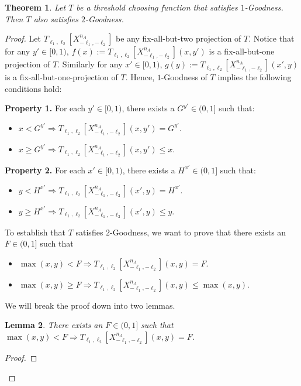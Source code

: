 \documentclass{article}
\newcommand{\xnmltwo}{X^{n_A}_{-\ell_1, -\ell_2}}
\newtheorem{theorem}{Theorem}[section]
\newtheorem{lemma}[theorem]{Lemma}
\begin{document}
\begin{theorem} \label{thm:1implies2}
Let $T$ be a threshold choosing function that satisfies $1$-Goodness. Then $T$ also satisfies $2$-Goodness.
\end{theorem}
\begin{proof}
Let $T_{\ell_1, \ell_2}[\xnmltwo]$ be any fix-all-but-two projection of $T$. Notice that
for any $y' \in [0,1)$, $f(x) := T_{\ell_1, \ell_2}[\xnmltwo](x, y')$ is a fix-all-but-one projection of $T$.
Similarly for any $x' \in [0,1)$, $g(y) := T_{\ell_1, \ell_2}[\xnmltwo](x', y)$ is a fix-all-but-one-projection of $T$. Hence, $1$-Goodness of $T$
implies the following conditions hold:

\medskip \noindent \textbf{Property 1.} For each $y' \in [0,1)$, there exists a $G^{y'} \in (0, 1]$ such that:
\begin{itemize}
\item $x   < G^{y'} \Rightarrow T_{\ell_1, \ell_2}[\xnmltwo](x,y') = G^{y'}$.
\item $x \ge G^{y'} \Rightarrow T_{\ell_1, \ell_2}[\xnmltwo](x,y') \le x$.
\end{itemize}

\medskip \noindent \textbf{Property 2.} For each $x' \in [0,1)$, there exists a $H^{x'} \in (0, 1]$ such that:
\begin{itemize}
\item $y   < H^{x'} \Rightarrow T_{\ell_1, \ell_2}[\xnmltwo](x',y) = H^{x'}$.
\item $y \ge H^{x'} \Rightarrow T_{\ell_1, \ell_2}[\xnmltwo](x',y) \le y$.
\end{itemize}


To establish that $T$ satisfies $2$-Goodness, we want to prove that  there exists an $F \in (0, 1]$ such that

\begin{itemize}
\item $\max(x,y)   < F \Rightarrow T_{\ell_1, \ell_2}[\xnmltwo](x,y) = F$.
\item $\max(x,y) \ge F \Rightarrow T_{\ell_1, \ell_2}[\xnmltwo](x,y) \le \max(x,y)$.
\end{itemize}

\noindent We will break the proof down into two lemmas.

\begin{lemma}\label{lemma1}
There exists an $F \in (0, 1]$ such that
$\max(x,y)   < F \Rightarrow T_{\ell_1, \ell_2}[\xnmltwo](x,y) = F$.
\end{lemma}
\begin{proof}


\end{proof}
\end{proof}
\end{document}
